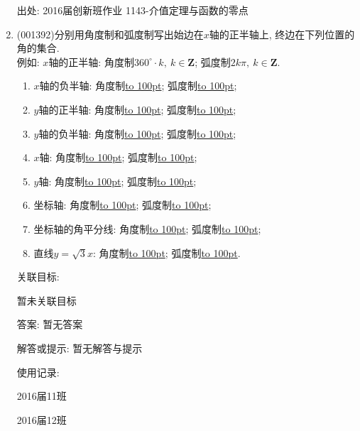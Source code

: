 \documentclass[10pt,a4paper]{article}
\newcommand{\blank}[1]{\underline{\hbox to #1pt{}}}
\begin{document}
\begin{enumerate}[1.]
出处: 2016届创新班作业	1143-介值定理与函数的零点
\item { (001392)}分别用角度制和弧度制写出始边在$x$轴的正半轴上, 终边在下列位置的角的集合.\\ 
例如: $x$轴的正半轴: 角度制\underline{$360^\circ \cdot k, \ k\in \mathbf{Z}$}; 弧度制\underline{$2k\pi, \ k\in \mathbf{Z}$}.
\begin{enumerate}[(1)]
\item $x$轴的负半轴: 角度制\blank{100}; 弧度制\blank{100};\\ 
\item $y$轴的正半轴: 角度制\blank{100}; 弧度制\blank{100};\\ 
\item $y$轴的负半轴: 角度制\blank{100}; 弧度制\blank{100};\\ 
\item $x$轴: 角度制\blank{100}; 弧度制\blank{100};\\ 
\item $y$轴: 角度制\blank{100}; 弧度制\blank{100};\\ 
\item 坐标轴: 角度制\blank{100}; 弧度制\blank{100};\\ 
\item 坐标轴的角平分线: 角度制\blank{100}; 弧度制\blank{100};\\ 
\item 直线$y=\sqrt{3}x$: 角度制\blank{100}; 弧度制\blank{100}.\\ 
\end{enumerate}


关联目标:

暂未关联目标

答案: 暂无答案

解答或提示: 暂无解答与提示

使用记录:

2016届11班								

2016届12班								



\end{enumerate}
\end{document}
